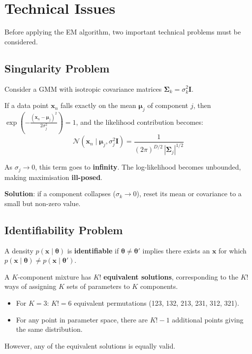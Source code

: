 \documentclass[11pt,a4paper]{article}
\theoremstyle{definition}
\theoremstyle{plain}
\theoremstyle{remark}
\begin{document}
\section{Technical Issues}

Before applying the EM algorithm, two important technical problems must be considered.

\subsection{Singularity Problem}

\begin{tcolorbox}[colback=red!5!white,colframe=red!75!black,title=\textbf{Singularity Problem}]
Consider a GMM with isotropic covariance matrices $\boldsymbol{\Sigma}_k = \sigma_k^2 \mathbf{I}$.

If a data point $\mathbf{x}_n$ falls exactly on the mean $\boldsymbol{\mu}_j$ of component $j$, then $\exp\left(-\frac{(\mathbf{x}_n - \boldsymbol{\mu}_j)^2}{2\sigma_j^2}\right) = 1$, and the likelihood contribution becomes:
\[
\mathcal{N}(\mathbf{x}_n \mid \boldsymbol{\mu}_j, \sigma_j^2 \mathbf{I}) = \frac{1}{(2\pi)^{D/2} \, |\boldsymbol{\Sigma}_j|^{1/2}}
\]

As $\sigma_j \to 0$, this term goes to \textbf{infinity}. The log-likelihood becomes unbounded, making maximisation \textbf{ill-posed}.
\end{tcolorbox}

\textbf{Solution}: if a component collapses ($\sigma_k \to 0$), reset its mean or covariance to a small but non-zero value.

\subsection{Identifiability Problem}

\begin{tcolorbox}[colback=red!5!white,colframe=red!75!black,title=\textbf{Identifiability Problem}]
A density $p(\mathbf{x} \mid \boldsymbol{\theta})$ is \textbf{identifiable} if $\boldsymbol{\theta} \neq \boldsymbol{\theta}'$ implies there exists an $\mathbf{x}$ for which $p(\mathbf{x} \mid \boldsymbol{\theta}) \neq p(\mathbf{x} \mid \boldsymbol{\theta}')$.

A $K$-component mixture has $K!$ \textbf{equivalent solutions}, corresponding to the $K!$ ways of assigning $K$ sets of parameters to $K$ components.

\begin{itemize}
    \item For $K=3$: $K! = 6$ equivalent permutations (123, 132, 213, 231, 312, 321).
    \item For any point in parameter space, there are $K! - 1$ additional points giving the same distribution.
\end{itemize}
However, any of the equivalent solutions is equally valid.
\end{tcolorbox}
\end{document}
